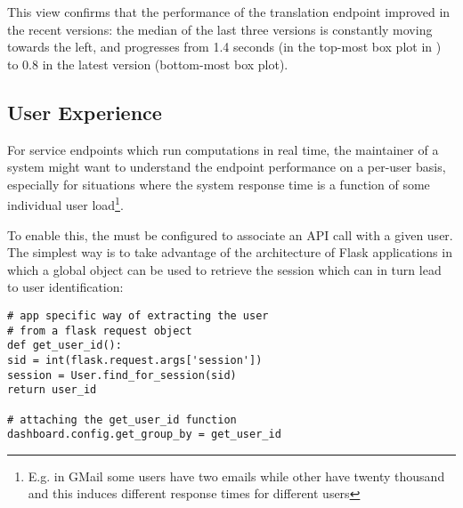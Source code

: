 \documentclass{sig-alternate-05-2015}
\begin{document}
  

  This view confirms that the performance of the translation endpoint improved in the recent versions: the median of the last three versions is constantly moving towards the left, and progresses from 1.4 seconds (in the top-most box plot in ) to 0.8 in the latest version (bottom-most box plot).
  

\subsection{User Experience}
\label{sec:user}

For service endpoints which run computations in real time, the maintainer of a system might want to understand the endpoint performance on a per-user basis, especially for situations where the system response time is a function of some individual user load\footnote{E.g. in GMail some users have two emails while other have twenty thousand and this induces different response times for different users}.


To enable this, the \tool must be configured to associate an API call with a given user. The simplest way is to take advantage of the architecture of Flask applications in which a global  object can be used to retrieve the session which can in turn lead to user identification: 

\begin{lstlisting}[style=custompython]  
# app specific way of extracting the user
# from a flask request object    
def get_user_id():
sid = int(flask.request.args['session'])
session = User.find_for_session(sid)
return user_id

# attaching the get_user_id function
dashboard.config.get_group_by = get_user_id

\end{lstlisting}
\end{document}
